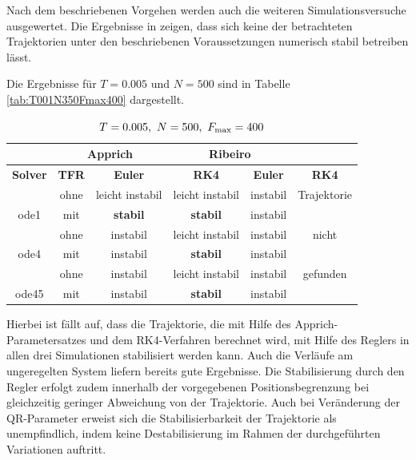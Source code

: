 Nach dem beschriebenen Vorgehen werden auch die weiteren Simulationsversuche ausgewertet. Die Ergebnisse in  zeigen, dass sich keine der betrachteten Trajektorien unter den beschriebenen Voraussetzungen numerisch stabil betreiben lässt.

Die Ergebnisse für $T=0.005$ und $N=500$ sind in Tabelle \ref{tab:T001N350Fmax400} dargestellt.

\begin{table}[htbp]
	\centering
		\begin{tabular}{c|c|c|c|c|c}
			\rowcolor[gray]{0.9}
			\multicolumn{2}{c|}{\textbf{Simulation}} & \multicolumn{2}{c|}{\textbf{Apprich}} & \multicolumn{2}{c}{\textbf{Ribeiro}} \\
			\midrule
			\rowcolor[gray]{0.9}
			\textbf{Solver} & \textbf{TFR} & \textbf{Euler} & \textbf{RK4} & \textbf{Euler} & \textbf{RK4} \\
			\midrule
			\cellcolor[gray]{0.9}  											& \cellcolor[gray]{.9}ohne & leicht instabil  & leicht instabil & instabil & Trajektorie\\
			\multirow{-2}{*}{\cellcolor[gray]{.9}ode1}	& \cellcolor[gray]{.9}mit  & \textbf{stabil} & \textbf{stabil} 			& instabil 				 & 	\\
			\midrule
			\cellcolor[gray]{0.9}  											& \cellcolor[gray]{.9}ohne & instabil	& leicht instabil & instabil & nicht\\
			\multirow{-2}{*}{\cellcolor[gray]{.9}ode4}	& \cellcolor[gray]{.9}mit  & instabil & \textbf{stabil} & instabil & \\
			\midrule	
			\cellcolor[gray]{0.9}  											& \cellcolor[gray]{.9}ohne & instabil	&  leicht instabil & instabil 	& gefunden\\
			\multirow{-2}{*}{\cellcolor[gray]{.9}ode45}	& \cellcolor[gray]{.9}mit  & instabil	&  \textbf{stabil}  & instabil 	& \																											
		\end{tabular}
	\caption{$T=0.005, \ N=500, \ F_{\mrm{max}}=400$}
	\label{tab:T0005N500Fmax400}
\end{table}

Hierbei ist fällt auf, dass die Trajektorie, die mit Hilfe des Apprich-Parametersatzes und dem RK4-Verfahren berechnet wird, mit Hilfe des Reglers in allen drei Simulationen stabilisiert werden kann. Auch die Verläufe am ungeregelten System liefern bereits gute Ergebnisse. Die Stabilisierung durch den Regler erfolgt zudem innerhalb der vorgegebenen Positionsbegrenzung bei gleichzeitig geringer Abweichung von der Trajektorie. Auch bei Veränderung der QR-Parameter erweist sich die Stabilisierbarkeit der Trajektorie als unempfindlich, indem keine Destabilisierung im Rahmen der durchgeführten Variationen auftritt.

